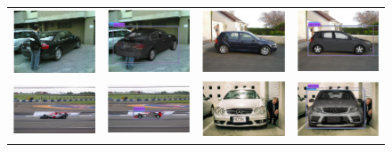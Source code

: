 \documentclass[10pt,twocolumn,letterpaper]{article}
\begin{document}
\begin{figure}[h]
\begin{tabular}{|cc|cc|}
  \includegraphics[width=0.24\linewidth]{supp/pas_car6a.png} &
  \includegraphics[width=0.24\linewidth]{supp/pas_car6b.png} & 
  \includegraphics[width=0.24\linewidth]{supp/pas_car7a.png} &
  \includegraphics[width=0.24\linewidth]{supp/pas_car7b.png}  \\
  \includegraphics[width=0.24\linewidth]{supp/pas_car10a.png} &
  \includegraphics[width=0.24\linewidth]{supp/pas_car10b.png} & 
  \includegraphics[width=0.24\linewidth]{supp/pas_car16a.png} &
  \includegraphics[width=0.24\linewidth]{supp/pas_car16b.png}  \\

\end{tabular}
\end{figure}
\end{document}
